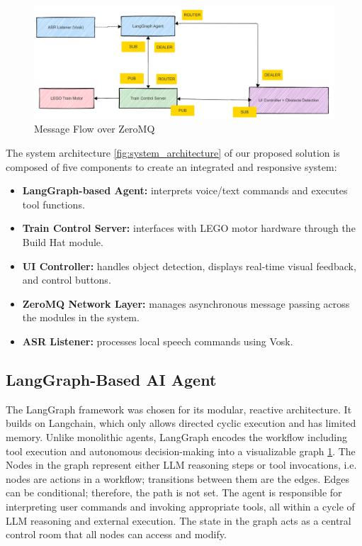\begin{figure}[H]
    \centering
    \label{fig:graph}
    \includegraphics[width=\textwidth]{docs/mqzt flow.png}
    \caption{Message Flow over ZeroMQ}
\end{figure}

The system architecture \ref{fig:system_architecture} of our proposed solution is composed of five components to create an integrated and responsive system:

\begin{itemize}
    \item \textbf{LangGraph-based Agent:} interprets voice/text commands and executes tool functions. 
    \item \textbf{Train Control Server:} interfaces with LEGO motor hardware through the Build Hat module.
    \item \textbf{UI Controller:} handles object detection, displays real-time visual feedback, and control buttons.
    \item \textbf{ZeroMQ Network Layer:} manages asynchronous message passing across the modules in the system.
    \item \textbf{ASR Listener:} processes local speech commands using Vosk.
\end{itemize}




\subsection{LangGraph-Based AI Agent}

The LangGraph framework was chosen for its modular, reactive architecture. It builds on Langchain, which only allows directed cyclic execution and has limited memory. Unlike monolithic agents, LangGraph encodes the workflow including tool execution and autonomous decision-making into a visualizable graph \ref{fig:graph}. The Nodes in the graph represent either LLM reasoning steps or tool invocations, i.e. nodes are actions in a workflow; transitions between them are the edges. Edges can be conditional; therefore, the path is not set. The agent is responsible for interpreting user commands and invoking appropriate tools, all within a cycle of LLM reasoning and external execution. The state in the graph acts as a central control room that all nodes can access and modify.

